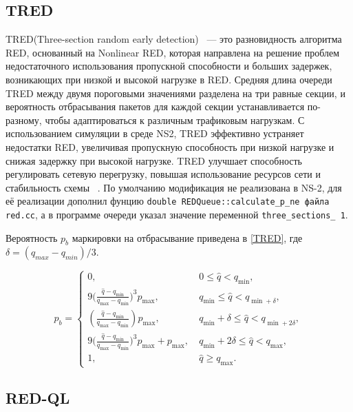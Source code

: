 \subsection{TRED}

TRED(Three-section random early detection) ~--- это разновидность алгоритма RED, основанный на Nonlinear RED, 
которая направлена на решение проблем недостаточного использования пропускной способности и больших задержек, 
возникающих при низкой и высокой нагрузке в RED. Средняя длина очереди TRED между двумя пороговыми значениями 
разделена на три равные секции, и вероятность отбрасывания пакетов для каждой секции устанавливается по-разному, 
чтобы адаптироваться к различным трафиковым нагрузкам. С использованием симуляции в среде NS2, TRED эффективно 
устраняет недостатки RED, увеличивая пропускную способность при низкой нагрузке и снижая задержку при высокой нагрузке. 
TRED улучшает способность регулировать сетевую перегрузку, повышая использование ресурсов сети и стабильность схемы ~\cite{TRED}. 
По умолчанию модификация не реализована в NS-2, для её реализации дополнил фунцию \verb|double REDQueue::calculate_p_ne файла red.cc|, 
а в программе очереди указал значение переменной \verb|three_sections_ 1|. 

Вероятность $p_{b}$ маркировки на отбрасывание приведена в \eqref{TRED}, где $ \delta = (q_{max} - q_{min})/3 $.

\begin{equation}
\label{TRED}
p_{b} = \begin{cases}
        0, &  \ 0 \leqslant \hat{q} < q_{\min},
        \\
        9({\frac{\hat{q} - q_{\min}}{q_{\max} - q_{\min}})^3} {p_{\max}}, & \ q_{\min} \leqslant  \hat{q} < q_{\min + \delta},
        \\
        (\frac{\hat{q} - q_{\min}}{q_{\max} - q_{\min}}) {p_{\max}}, & \ q_{\min} + \delta \leqslant \hat{q} < q_{\min + 2\delta},
        \\
        9({\frac{\hat{q} - q_{\min}}{q_{\max} - q_{\min}})^3} {p_{\max}} + {p_{\max}}, & \ q_{\min} +2\delta \leqslant  \hat{q} < q_{\max},
        \\
        1, &  \ \hat{q} \geqslant q_{\max}.
\end{cases}
\end{equation} 


\subsection{RED-QL}

